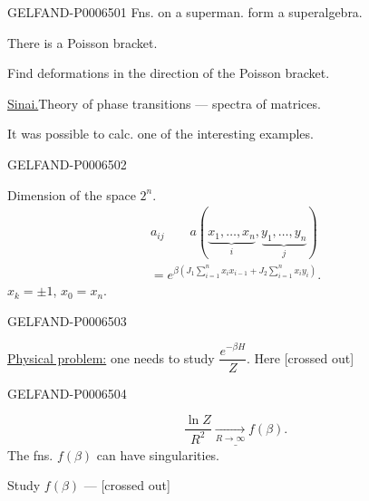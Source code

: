 \begin{GelfandAdjacentEvidence}{GELFAND-P000650}{1}
Fns. on a superman. form a superalgebra.

There is a Poisson bracket.

Find deformations in the direction of the Poisson bracket.

\underline{Sinai.}\quad Theory of phase transitions --- spectra of matrices.

It was possible to calc. one of the interesting examples.
\end{GelfandAdjacentEvidence}
\begin{GelfandAdjacentEvidence}{GELFAND-P000650}{2}


Dimension of the space \(2^n\).
\[
\begin{gathered}
a_{ij}\qquad a(\underbrace{x_1,\ldots,x_n}_{i},\underbrace{y_1,\ldots,y_n}_{j})\\
={e}^{\beta\left(J_1\sum_{i=1}^n x_i x_{i-1}
                  +J_2\sum_{i=1}^n x_i y_i\right)}.
\end{gathered}
\]
\(x_k=\pm1\), \underline{\(x_0=x_n\)}.
\end{GelfandAdjacentEvidence}
\begin{GelfandAdjacentEvidence}{GELFAND-P000650}{3}


\underline{Physical problem:} one needs to study \(\dfrac{e^{-\beta H}}{Z}\). Here [crossed out]
\end{GelfandAdjacentEvidence}
\begin{GelfandAdjacentEvidence}{GELFAND-P000650}{4}

\[
\underline{\frac{\ln Z}{R^2}\underset{R\to\infty}{\longrightarrow}f(\beta).}
\]
The fns. \(f(\beta)\) can have singularities.

Study \(f(\beta)\) --- [crossed out]
\end{GelfandAdjacentEvidence}
